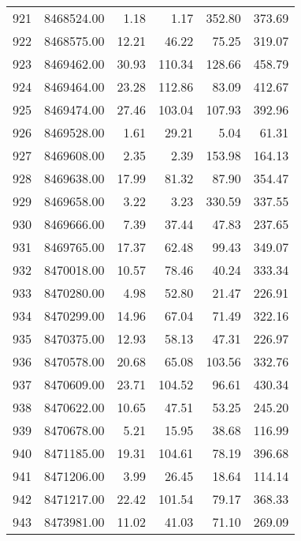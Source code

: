 \begin{table}[ht]
\begin{tabular}{rrrrrr}
  921 & 8468524.00 & 1.18 & 1.17 & 352.80 & 373.69 \\ 
  922 & 8468575.00 & 12.21 & 46.22 & 75.25 & 319.07 \\ 
  923 & 8469462.00 & 30.93 & 110.34 & 128.66 & 458.79 \\ 
  924 & 8469464.00 & 23.28 & 112.86 & 83.09 & 412.67 \\ 
  925 & 8469474.00 & 27.46 & 103.04 & 107.93 & 392.96 \\ 
  926 & 8469528.00 & 1.61 & 29.21 & 5.04 & 61.31 \\ 
  927 & 8469608.00 & 2.35 & 2.39 & 153.98 & 164.13 \\ 
  928 & 8469638.00 & 17.99 & 81.32 & 87.90 & 354.47 \\ 
  929 & 8469658.00 & 3.22 & 3.23 & 330.59 & 337.55 \\ 
  930 & 8469666.00 & 7.39 & 37.44 & 47.83 & 237.65 \\ 
  931 & 8469765.00 & 17.37 & 62.48 & 99.43 & 349.07 \\ 
  932 & 8470018.00 & 10.57 & 78.46 & 40.24 & 333.34 \\ 
  933 & 8470280.00 & 4.98 & 52.80 & 21.47 & 226.91 \\ 
  934 & 8470299.00 & 14.96 & 67.04 & 71.49 & 322.16 \\ 
  935 & 8470375.00 & 12.93 & 58.13 & 47.31 & 226.97 \\ 
  936 & 8470578.00 & 20.68 & 65.08 & 103.56 & 332.76 \\ 
  937 & 8470609.00 & 23.71 & 104.52 & 96.61 & 430.34 \\ 
  938 & 8470622.00 & 10.65 & 47.51 & 53.25 & 245.20 \\ 
  939 & 8470678.00 & 5.21 & 15.95 & 38.68 & 116.99 \\ 
  940 & 8471185.00 & 19.31 & 104.61 & 78.19 & 396.68 \\ 
  941 & 8471206.00 & 3.99 & 26.45 & 18.64 & 114.14 \\ 
  942 & 8471217.00 & 22.42 & 101.54 & 79.17 & 368.33 \\ 
  943 & 8473981.00 & 11.02 & 41.03 & 71.10 & 269.09 \\ 
   \hline
\end{tabular}
\end{table}
